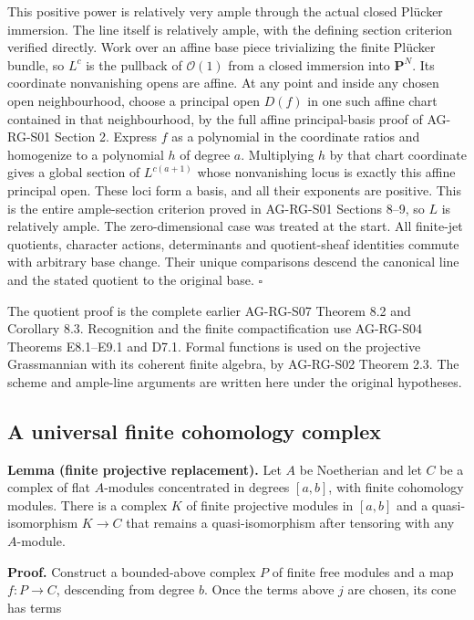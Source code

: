 \documentclass[11pt,a4paper,openany]{report}
\begin{document}
This positive power is relatively very ample through the actual closed Plücker immersion. The line itself is relatively ample, with the defining section criterion verified directly. Work over an affine base piece trivializing the finite Plücker bundle, so \(L^c\) is the pullback of \(\mathcal O(1)\) from a closed immersion into \(\mathbf P^N\). Its coordinate nonvanishing opens are affine. At any point and inside any chosen open neighbourhood, choose a principal open \(D(f)\) in one such affine chart contained in that neighbourhood, by the full affine principal-basis proof of AG-RG-S01 Section 2. Express \(f\) as a polynomial in the coordinate ratios and homogenize to a polynomial \(h\) of degree \(a\). Multiplying \(h\) by that chart coordinate gives a global section of \(L^{c(a+1)}\) whose nonvanishing locus is exactly this affine principal open. These loci form a basis, and all their exponents are positive. This is the entire ample-section criterion proved in AG-RG-S01 Sections 8--9, so \(L\) is relatively ample. The zero-dimensional case was treated at the start. All finite-jet quotients, character actions, determinants and quotient-sheaf identities commute with arbitrary base change. Their unique comparisons descend the canonical line and the stated quotient to the original base. \(\square\)

The quotient proof is the complete earlier AG-RG-S07 Theorem 8.2 and Corollary 8.3. Recognition and the finite compactification use AG-RG-S04 Theorems E8.1--E9.1 and D7.1. Formal functions is used on the projective Grassmannian with its coherent finite algebra, by AG-RG-S02 Theorem 2.3. The scheme and ample-line arguments are written here under the original hypotheses.

\subsection{A universal finite cohomology complex}\label{AG-RG-03-a-universal-finite-cohomology-complex}

\textbf{Lemma (finite projective replacement).} Let \(A\) be Noetherian and let \(C\) be a complex of flat \(A\)-modules concentrated in degrees \([a,b]\), with finite cohomology modules. There is a complex \(K\) of finite projective modules in \([a,b]\) and a quasi-isomorphism \(K\to C\) that remains a quasi-isomorphism after tensoring with any \(A\)-module.

\textbf{Proof.} Construct a bounded-above complex \(P\) of finite free modules and a map \(f:P\to C\), descending from degree \(b\). Once the terms above \(j\) are chosen, its cone has terms
\end{document}
